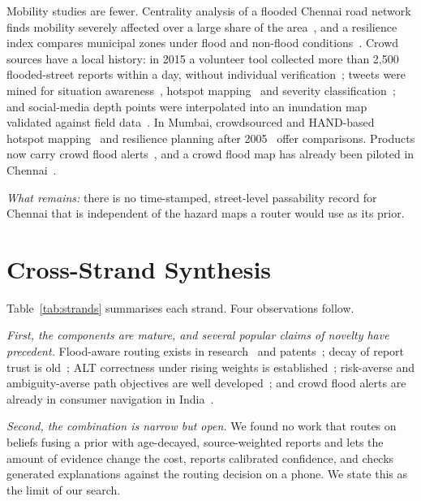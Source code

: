 \documentclass[journal]{IEEEtran}
\begin{document}
Mobility studies are fewer. Centrality analysis of a flooded Chennai road network finds mobility severely affected over a large share of the area~\cite{ms2022analyzing}, and a resilience index compares municipal zones under flood and non-flood conditions~\cite{ms2022measurement}. Crowd sources have a local history: in 2015 a volunteer tool collected more than 2,500 flooded-street reports within a day, without individual verification~\cite{naik2016flooded}; tweets were mined for situation awareness~\cite{pandey2016social}, hotspot mapping~\cite{sattaru2021utilizing} and severity classification~\cite{kanth2022deep}; and social-media depth points were interpolated into an inundation map validated against field data~\cite{karmegam2021chennai}. In Mumbai, crowdsourced and HAND-based hotspot mapping~\cite{tripathy2024mumbai} and resilience planning after 2005~\cite{gupta2007urban} offer comparisons. Products now carry crowd flood alerts~\cite{ramani2025maps,mappls2026post}, and a crowd flood map has already been piloted in Chennai~\cite{urbanrisklab2019riskmap}.

\emph{What remains:} there is no time-stamped, street-level passability record for Chennai that is independent of the hazard maps a router would use as its prior.

\section{Cross-Strand Synthesis}\label{sec:synthesis}
Table~\ref{tab:strands} summarises each strand. Four observations follow.

\emph{First, the components are mature, and several popular claims of novelty have precedent.} Flood-aware routing exists in research~\cite{li2023dijkstra,liang2025rescue,li2025drl,an2025dam,defaria2026routing,panakkal2023safer} and patents~\cite{ibm2013patent,uber2020patent}; decay of report trust is old~\cite{josang2002beta,rosen2016persistence}; ALT correctness under rising weights is established~\cite{delling2007landmark,nannicini2012bidir}; risk-averse and ambiguity-averse path objectives are well developed~\cite{toumazis2016wcvar,filippi2025survey,gilboa1989maxmin}; and crowd flood alerts are already in consumer navigation in India~\cite{ramani2025maps,mappls2026post}.

\emph{Second, the combination is narrow but open.} We found no work that routes on beliefs fusing a prior with age-decayed, source-weighted reports and lets the amount of evidence change the cost, reports calibrated confidence, and checks generated explanations against the routing decision on a phone. We state this as the limit of our search.
\end{document}

